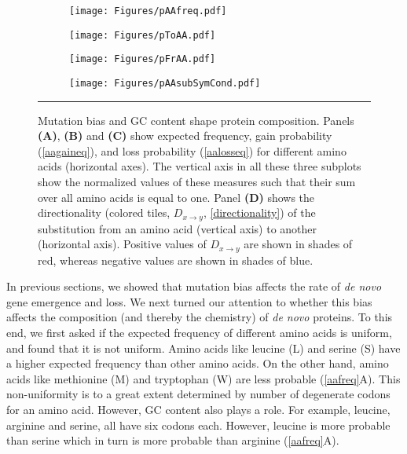 \documentclass[12pt,a4paper]{article}
\begin{document}
\begin{figure}[!t]
\centering
\begin{subfigure}{0.47\textwidth}
\caption{}
\flushleft
\texttt{[image: Figures/pAAfreq.pdf]}
\end{subfigure}\hfill%
\begin{subfigure}{0.47\textwidth}
\caption{}
\flushleft
\texttt{[image: Figures/pToAA.pdf]}
\end{subfigure}

\vspace{1em}

\begin{subfigure}[t]{0.47\textwidth}
\caption{}
\flushleft
\texttt{[image: Figures/pFrAA.pdf]}
\end{subfigure}\hfill%
\begin{subfigure}[t]{0.47\textwidth}
\caption{}
\flushright
\texttt{[image: Figures/pAAsubSymCond.pdf]}
\end{subfigure}

\caption{Mutation bias and GC content shape protein composition. Panels \textbf{(A)}, \textbf{(B)} and \textbf{(C)} show expected frequency, gain probability (\autoref{aagaineq}), and loss probability (\autoref{aalosseq}) for different amino acids (horizontal axes). The vertical axis in all these three subplots show the normalized values of these measures such that their sum over all amino acids is equal to one. Panel \textbf{(D)} shows the directionality (colored tiles, $\textit{D}_{x\to y}$, \autoref{directionality}) of the substitution from an amino acid (vertical axis) to another (horizontal axis). Positive values of $\textit{D}_{x\to y}$ are shown in shades of red, whereas negative values are shown in shades of blue.}
\label{aafreq}

\vspace{1ex}
\hrule
\end{figure}

In previous sections, we showed that mutation bias affects the rate of \textit{de novo} gene emergence and loss. We next turned our attention to whether this bias affects the composition (and thereby the chemistry) of \textit{de novo} proteins. To this end, we first asked if the expected frequency of different amino acids is uniform, and found that it is not uniform. Amino acids like leucine (L) and serine (S) have a higher expected frequency than other amino acids. On the other hand, amino acids like methionine (M) and tryptophan (W) are less probable (\autoref{aafreq}{\color{blue}A}). This non-uniformity is to a great extent determined by number of degenerate codons for an amino acid. However, GC content also plays a role. For example, leucine, arginine and serine, all have six codons each. However, leucine is more probable than serine which in turn is more probable than arginine (\autoref{aafreq}{\color{blue}A}). 
\end{document}
